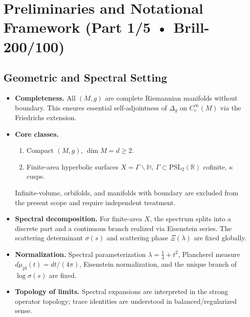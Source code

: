 
\chapter{Preliminaries and Notational Framework (Part 1/5 • Brill-200/100)}
\label{chap:preliminaries-part1}

\section{Geometric and Spectral Setting}
\label{sec:geom-spectral-setting-part1}

\begin{tcolorbox}[colback=gray!5,colframe=gray!55,
  title=Scope \& Assumptions (Part 1/5 • Brill-200/100 • Sealed)]
\begin{itemize}
  \item \textbf{Completeness.} All $(M,g)$ are complete Riemannian manifolds without boundary. This ensures essential self-adjointness of $\Delta_g$ on $C_c^\infty(M)$ via the Friedrichs extension.
  \item \textbf{Core classes.}
  \begin{enumerate}[label=(\roman*)]
    \item Compact $(M,g)$, $\dim M = d \geq 2$.
    \item Finite-area hyperbolic surfaces $X=\Gamma\backslash \mathbb H$, $\Gamma \subset \mathrm{PSL}_2(\mathbb R)$ cofinite, $\kappa$ cusps.
  \end{enumerate}
  Infinite-volume, orbifolds, and manifolds with boundary are excluded from the present scope and require independent treatment.
  \item \textbf{Spectral decomposition.} For finite-area $X$, the spectrum splits into a discrete part and a continuous branch realized via Eisenstein series. The scattering determinant $\sigma(s)$ and scattering phase $\Xi(\lambda)$ are fixed globally.
  \item \textbf{Normalization.} Spectral parameterization $\lambda=\tfrac14+t^2$, Plancherel measure $d\mu_{\mathrm{pl}}(t)=dt/(4\pi)$, Eisenstein normalization, and the unique branch of $\log\sigma(s)$ are fixed.
  \item \textbf{Topology of limits.} Spectral expansions are interpreted in the strong operator topology; trace identities are understood in balanced/regularized sense.
\end{itemize}
\end{tcolorbox}


